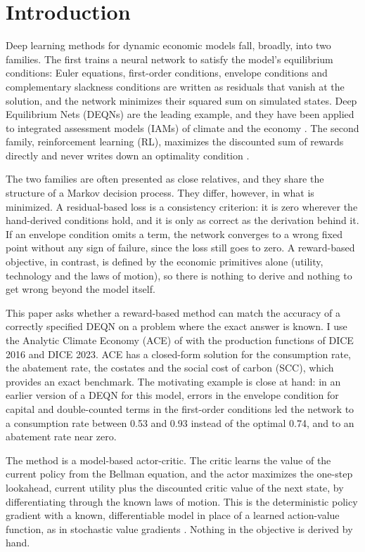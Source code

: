 \section{Introduction}

Deep learning methods for dynamic economic models fall, broadly, into two families. The first trains a neural network to satisfy the model's equilibrium conditions: Euler equations, first-order conditions, envelope conditions and complementary slackness conditions are written as residuals that vanish at the solution, and the network minimizes their squared sum on simulated states. Deep Equilibrium Nets (DEQNs) \parencite{Azinovic2022DEQN} are the leading example, and they have been applied to integrated assessment models (IAMs) of climate and the economy \parencite{Folini2024ClimateInCE, friedl2023_deepUQ}. The second family, reinforcement learning (RL), maximizes the discounted sum of rewards directly and never writes down an optimality condition \parencite{Sutton2018intro_to_rl, Bertsekas2019RLOC}.

The two families are often presented as close relatives, and they share the structure of a Markov decision process. They differ, however, in what is minimized. A residual-based loss is a consistency criterion: it is zero wherever the hand-derived conditions hold, and it is only as correct as the derivation behind it. If an envelope condition omits a term, the network converges to a wrong fixed point without any sign of failure, since the loss still goes to zero. A reward-based objective, in contrast, is defined by the economic primitives alone (utility, technology and the laws of motion), so there is nothing to derive and nothing to get wrong beyond the model itself.

This paper asks whether a reward-based method can match the accuracy of a correctly specified DEQN on a problem where the exact answer is known. I use the Analytic Climate Economy (ACE) of \textcite{TraegerChristian2023ACE} with the production functions of DICE 2016 and DICE 2023. ACE has a closed-form solution for the consumption rate, the abatement rate, the costates and the social cost of carbon (SCC), which provides an exact benchmark. The motivating example is close at hand: in an earlier version of a DEQN for this model, errors in the envelope condition for capital and double-counted terms in the first-order conditions led the network to a consumption rate between 0.53 and 0.93 instead of the optimal 0.74, and to an abatement rate near zero.

The method is a model-based actor-critic. The critic learns the value of the current policy from the Bellman equation, and the actor maximizes the one-step lookahead, current utility plus the discounted critic value of the next state, by differentiating through the known laws of motion. This is the deterministic policy gradient \parencite{Silver2014DPG} with a known, differentiable model in place of a learned action-value function, as in stochastic value gradients \parencite{Heess2015SVG}. Nothing in the objective is derived by hand.

